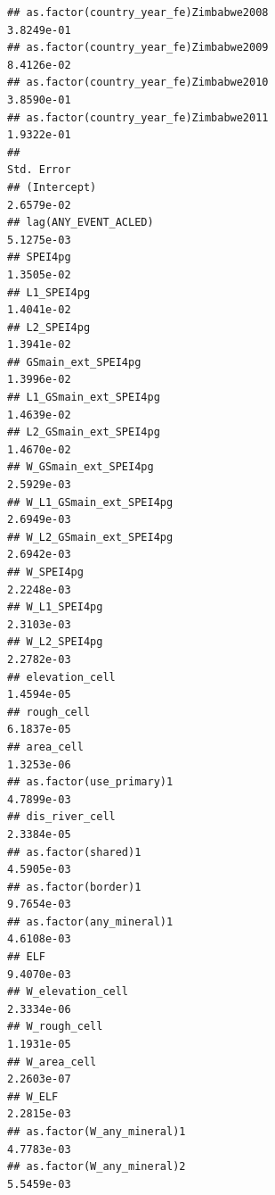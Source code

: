 \documentclass[
  a4paper,
]{article}
\begin{document}
\begin{verbatim}
## as.factor(country_year_fe)Zimbabwe2008                          3.8249e-01
## as.factor(country_year_fe)Zimbabwe2009                          8.4126e-02
## as.factor(country_year_fe)Zimbabwe2010                          3.8590e-01
## as.factor(country_year_fe)Zimbabwe2011                          1.9322e-01
##                                                                 Std. Error
## (Intercept)                                                     2.6579e-02
## lag(ANY_EVENT_ACLED)                                            5.1275e-03
## SPEI4pg                                                         1.3505e-02
## L1_SPEI4pg                                                      1.4041e-02
## L2_SPEI4pg                                                      1.3941e-02
## GSmain_ext_SPEI4pg                                              1.3996e-02
## L1_GSmain_ext_SPEI4pg                                           1.4639e-02
## L2_GSmain_ext_SPEI4pg                                           1.4670e-02
## W_GSmain_ext_SPEI4pg                                            2.5929e-03
## W_L1_GSmain_ext_SPEI4pg                                         2.6949e-03
## W_L2_GSmain_ext_SPEI4pg                                         2.6942e-03
## W_SPEI4pg                                                       2.2248e-03
## W_L1_SPEI4pg                                                    2.3103e-03
## W_L2_SPEI4pg                                                    2.2782e-03
## elevation_cell                                                  1.4594e-05
## rough_cell                                                      6.1837e-05
## area_cell                                                       1.3253e-06
## as.factor(use_primary)1                                         4.7899e-03
## dis_river_cell                                                  2.3384e-05
## as.factor(shared)1                                              4.5905e-03
## as.factor(border)1                                              9.7654e-03
## as.factor(any_mineral)1                                         4.6108e-03
## ELF                                                             9.4070e-03
## W_elevation_cell                                                2.3334e-06
## W_rough_cell                                                    1.1931e-05
## W_area_cell                                                     2.2603e-07
## W_ELF                                                           2.2815e-03
## as.factor(W_any_mineral)1                                       4.7783e-03
## as.factor(W_any_mineral)2                                       5.5459e-03

\end{verbatim}
\end{document}
